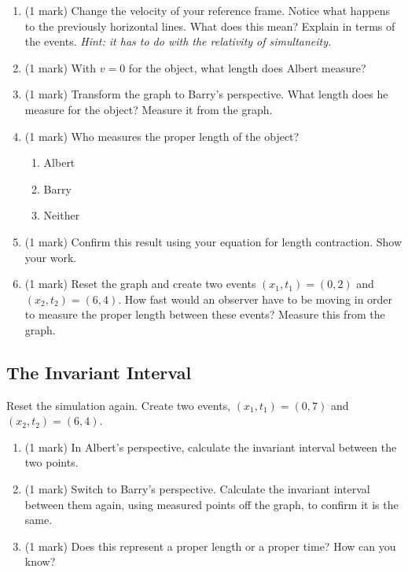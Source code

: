 \documentclass{article}
\begin{document}
\begin{enumerate}
\item (1 mark) Change the velocity of your reference frame. Notice what happens to the previously horizontal lines. What does this mean? Explain in terms of the events. \textit{Hint: it has to do with the relativity of simultaneity.}
\vspace{4cm}
\item (1 mark) With $v=0$ for the object, what length does Albert measure?
\vspace{2cm}
\item (1 mark) Transform the graph to Barry's perspective. What length does he measure for the object? Measure it from the graph.
\vspace{2cm}
\clearpage
\item (1 mark) Who measures the proper length of the object?
\begin{enumerate}
\item Albert
\item Barry
\item Neither
\end{enumerate}
\item (1 mark) Confirm this result using your equation for length contraction. Show your work.
\vspace{4cm}

\item (1 mark) Reset the graph and create two events $(x_1,t_1)=(0,2)$ and $(x_2,t_2)=(6,4)$. How fast would an observer have to be moving in order to measure the proper length between these events? Measure this from the graph.
\end{enumerate}


\subsection*{The Invariant Interval}

Reset the simulation again. Create two events, $(x_1,t_1)=(0,7)$ and $(x_2,t_2)=(6,4)$.

\begin{enumerate}
\item (1 mark) In Albert's perspective, calculate the invariant interval between the two points.
\vspace{4cm}
\item (1 mark) Switch to Barry's perspective. Calculate the invariant interval between them again, using measured points off the graph, to confirm it is the same.
\vspace{4cm}
\item (1 mark) Does this represent a proper length or a proper time? How can you know?
\vspace{4cm}
\end{enumerate}
\end{document}

